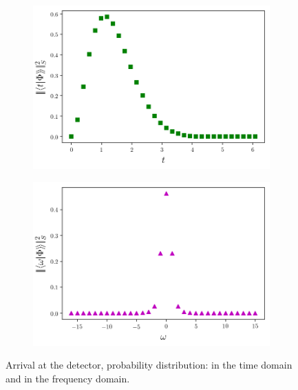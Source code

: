 \begin{figure}
  \centering
  \begin{subfigure}[b]{0.49\textwidth}
    \includegraphics[width=\linewidth]{img/2ldetect/pw-detect-prob.png}
    \subcaption{}\label{fig:2l_pw_detect_prob_t}
  \end{subfigure}
  \begin{subfigure}[b]{0.49\textwidth}
    \includegraphics[width=\linewidth]{img/2ldetect/pw-detect-prob-ft.png}
    \subcaption{}\label{fig:2l_pw_detect_prob_omega}
  \end{subfigure}
  \caption{
    Arrival at the detector, probability distribution:
     in the time domain
    and  in the frequency domain.
  }
  \label{fig:2l_pw_detect_prob}
\end{figure}

